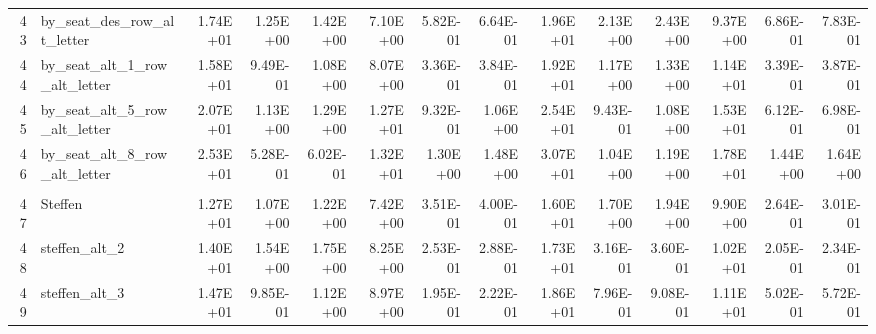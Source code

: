 \documentclass[11pt]{article}
\begin{document}
\begin{table}[htbp]
\begin{tabular}{rlrrrrrrrrrrrr}
    43    & by\_seat\_des\_row\_alt\_letter & 1.74E+01 & 1.25E+00 & 1.42E+00 & 7.10E+00 & 5.82E-01 & 6.64E-01 & 1.96E+01 & 2.13E+00 & 2.43E+00 & 9.37E+00 & 6.86E-01 & 7.83E-01 \\
    44    & by\_seat\_alt\_1\_row\_alt\_letter & 1.58E+01 & 9.49E-01 & 1.08E+00 & 8.07E+00 & 3.36E-01 & 3.84E-01 & 1.92E+01 & 1.17E+00 & 1.33E+00 & 1.14E+01 & 3.39E-01 & 3.87E-01 \\
    45    & by\_seat\_alt\_5\_row\_alt\_letter & 2.07E+01 & 1.13E+00 & 1.29E+00 & 1.27E+01 & 9.32E-01 & 1.06E+00 & 2.54E+01 & 9.43E-01 & 1.08E+00 & 1.53E+01 & 6.12E-01 & 6.98E-01 \\
    46    & by\_seat\_alt\_8\_row\_alt\_letter & 2.53E+01 & 5.28E-01 & 6.02E-01 & 1.32E+01 & 1.30E+00 & 1.48E+00 & 3.07E+01 & 1.04E+00 & 1.19E+00 & 1.78E+01 & 1.44E+00 & 1.64E+00 \\
          &       &       &       &       &       &       &       &       &       &       &       &       &  \\
    47    & Steffen & 1.27E+01 & 1.07E+00 & 1.22E+00 & 7.42E+00 & 3.51E-01 & 4.00E-01 & 1.60E+01 & 1.70E+00 & 1.94E+00 & 9.90E+00 & 2.64E-01 & 3.01E-01 \\
    48    & steffen\_alt\_2 & 1.40E+01 & 1.54E+00 & 1.75E+00 & 8.25E+00 & 2.53E-01 & 2.88E-01 & 1.73E+01 & 3.16E-01 & 3.60E-01 & 1.02E+01 & 2.05E-01 & 2.34E-01 \\
    49    & steffen\_alt\_3 & 1.47E+01 & 9.85E-01 & 1.12E+00 & 8.97E+00 & 1.95E-01 & 2.22E-01 & 1.86E+01 & 7.96E-01 & 9.08E-01 & 1.11E+01 & 5.02E-01 & 5.72E-01 \\
    \end{tabular}%
  \label{tab:addlabel}%
\end{table}%

		
\end{document}
